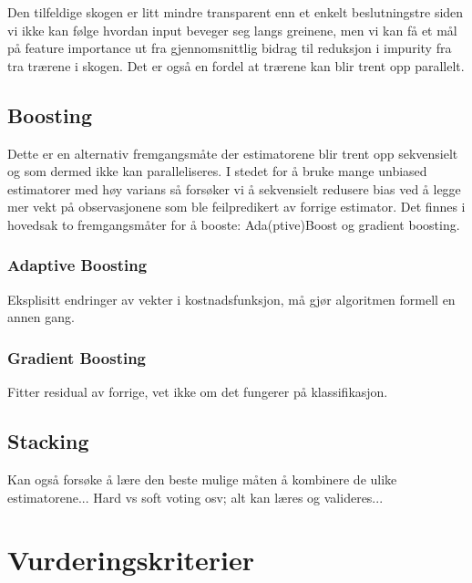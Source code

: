 Den tilfeldige skogen er litt mindre transparent enn et enkelt beslutningstre siden vi ikke kan følge hvordan input beveger seg langs greinene, men vi kan få et mål på feature importance ut fra gjennomsnittlig bidrag til reduksjon i impurity fra tra trærene i skogen. Det er også en fordel at trærene kan blir trent opp parallelt.
\subsection{Boosting}
Dette er en alternativ fremgangsmåte der estimatorene blir trent opp sekvensielt og som dermed ikke kan paralleliseres. I stedet for å bruke mange unbiased estimatorer med høy varians så forsøker vi å sekvensielt redusere bias ved å legge mer vekt på observasjonene som ble feilpredikert av forrige estimator. Det finnes i hovedsak to fremgangsmåter for å booste: Ada(ptive)Boost og gradient boosting.
\subsubsection{Adaptive Boosting}
Eksplisitt endringer av vekter i kostnadsfunksjon, må gjør algoritmen formell en annen gang.
\subsubsection{Gradient Boosting}
Fitter residual av forrige, vet ikke om det fungerer på klassifikasjon.
\subsection{Stacking}
Kan også forsøke å lære den beste mulige måten å kombinere de ulike estimatorene... Hard vs soft voting osv; alt kan læres og valideres...
\section{Vurderingskriterier}
